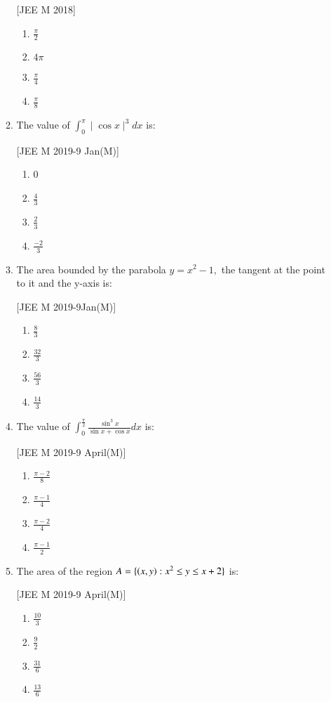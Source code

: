 \documentclass[journal,12pt,twocolumn]{IEEEtran}
\theoremstyle{remark}
\begin{document}
\begin{enumerate}
\begin{enumerate}
		\hfill{[JEE M 2018]}
		\begin{enumerate}
			\item $\frac{\pi}{2}$
			\item $4\pi$
			\item $\frac{\pi}{4}$
			\item $\frac{\pi}{8}$
		\end{enumerate}
	\item The value of $\int_{0}^{\pi}\mid{\cos x}\mid^{3}dx$ is:

		\hfill{[JEE M 2019-9 Jan(M)]}
		\begin{enumerate}
			\item 0
			\item $\frac{4}{3}$
			\item $\frac{2}{3}$
			\item $\frac{-2}{3}$
		\end{enumerate}
	\item The area  bounded by the parabola $y=x^{2}-1,$ the tangent at the point  to it and the y-axis is:

		\hfill{[JEE M 2019-9Jan(M)]}
		\begin{enumerate}
			\item $\frac{8}{3}$
			\item $\frac{32}{3}$
			\item $\frac{56}{3}$
			\item $\frac{14}{3}$
		\end{enumerate}
	\item The value of $\int_{0}^{\frac{\pi}{2}}\frac{\sin^{3} x}{\sin x + \cos x}dx$ is:

		\hfill{[JEE M 2019-9 April(M)]}
		\begin{enumerate}
			\item $\frac{\pi-2}{8}$
			\item $\frac{\pi-1}{4}$
			\item $\frac{\pi-2}{4}$
			\item $\frac{\pi-1}{2}$
		\end{enumerate}
	\item The area  of the region $A=\{\left(x,y\right):x^{2}\leq y\leq x+2\}$ is:

		\hfill{[JEE M 2019-9 April(M)]}
		\begin{enumerate}
			\item $\frac{10}{3}$
			\item $\frac{9}{2}$
			\item $\frac{31}{6}$
			\item $\frac{13}{6}$
		\end{enumerate}
\end{enumerate}
\end{enumerate}
\end{document}
